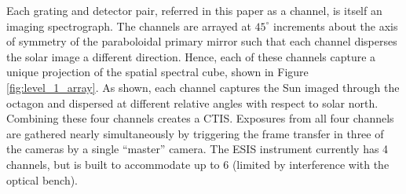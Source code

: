    	
    	
    	Each grating and detector pair, referred in this paper as a channel, is itself an imaging spectrograph.  
    	The channels are arrayed at $45^{\circ}$ increments about the axis of symmetry of the paraboloidal primary mirror such that each channel disperses the solar image a different direction. 
    	Hence, each of these channels capture a unique projection of the spatial spectral cube, shown in Figure \ref{fig:level_1_array}. 
    	As shown, each channel captures the Sun imaged through the octagon and dispersed at different relative angles with respect to solar north. Combining these four channels creates a CTIS. 
    	Exposures from all four channels are gathered nearly simultaneously by triggering the frame transfer in three of the cameras by a single ``master'' camera. 
    	The ESIS instrument currently has 4 channels, but is built to accommodate up to 6 (limited by interference with the optical bench).

    	
	
    
